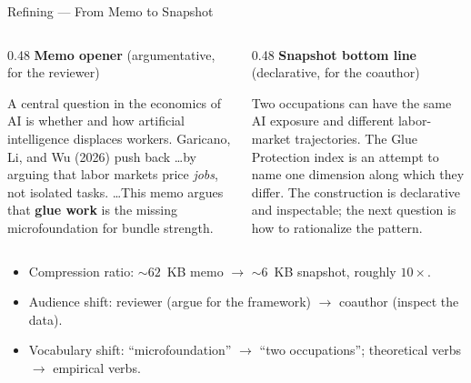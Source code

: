 \documentclass[10pt,english,aspectratio=169]{beamer}
\begin{document}
\begin{frame}{Refining --- From Memo to Snapshot}
\begin{columns}[T]
\begin{column}{0.48\textwidth}
\textbf{Memo opener} (argumentative, for the reviewer)
\begin{tcolorbox}[colback=gray!5,colframe=gray!40]
\scriptsize
A central question in the economics of AI is whether and how artificial intelligence displaces workers. Garicano, Li, and Wu (2026) push back \dots by arguing that labor markets price \emph{jobs}, not isolated tasks. \dots This memo argues that \textbf{glue work} is the missing microfoundation for bundle strength.
\end{tcolorbox}
\end{column}
\begin{column}{0.48\textwidth}
\textbf{Snapshot bottom line} (declarative, for the coauthor)
\begin{tcolorbox}[colback=gray!5,colframe=gray!40]
\scriptsize
Two occupations can have the same AI exposure and different labor-market trajectories. The Glue Protection index is an attempt to name one dimension along which they differ. The construction is declarative and inspectable; the next question is how to rationalize the pattern.
\end{tcolorbox}
\end{column}
\end{columns}

\vspace{0.2cm}
\begin{itemize}\scriptsize
  \item Compression ratio: $\sim 62$~KB memo $\to$ $\sim 6$~KB snapshot, roughly $10\times$.
  \item Audience shift: reviewer (argue for the framework) $\to$ coauthor (inspect the data).
  \item Vocabulary shift: ``microfoundation'' $\to$ ``two occupations''; theoretical verbs $\to$ empirical verbs.
\end{itemize}
\end{frame}
\end{document}
